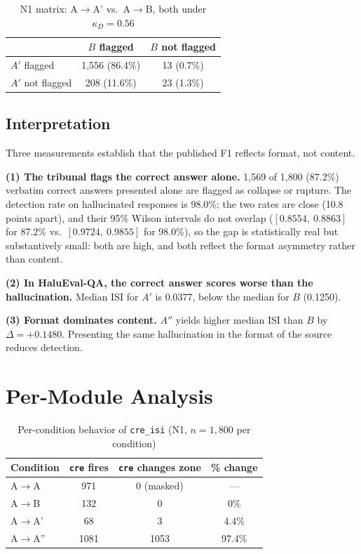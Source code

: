 \documentclass[11pt,a4paper]{article}
\begin{document}
\begin{table}[H]
\centering
\caption{N1 matrix: A$\rightarrow$A' vs.\ A$\rightarrow$B, both under $\kappa_D=0.56$}
\label{tab:n1-matrix}
\begin{tabular}{@{}lcc@{}}
\toprule
 & $B$ flagged & $B$ not flagged \\
\midrule
$A'$ flagged & 1{,}556 (86.4\%) & 13 (0.7\%) \\
$A'$ not flagged & 208 (11.6\%) & 23 (1.3\%) \\
\bottomrule
\end{tabular}
\end{table}

\subsection{Interpretation}
Three measurements establish that the published F1 reflects format, not content.

\textbf{(1) The tribunal flags the correct answer alone.} 1{,}569 of 1{,}800 (87.2\%) verbatim correct answers presented alone are flagged as collapse or rupture. The detection rate on hallucinated responses is 98.0\%; the two rates are close (10.8 points apart), and their 95\% Wilson intervals do not overlap ($[0.8554,\ 0.8863]$ for 87.2\% vs.\ $[0.9724,\ 0.9855]$ for 98.0\%), so the gap is statistically real but substantively small: both are high, and both reflect the format asymmetry rather than content.

\textbf{(2) In HaluEval-QA, the correct answer scores worse than the hallucination.} Median ISI for $A'$ is 0.0377, below the median for $B$ (0.1250).

\textbf{(3) Format dominates content.} $A''$ yields higher median ISI than $B$ by $\Delta = +0.1480$. Presenting the same hallucination in the format of the source reduces detection.

\section{Per-Module Analysis}
\label{sec:cre-contribution}

\begin{table}[H]
\centering
\caption{Per-condition behavior of \texttt{cre\_isi} (N1, $n=1{,}800$ per condition)}
\label{tab:cre-by-condition}
\begin{tabular}{@{}lccc@{}}
\toprule
Condition & \texttt{cre} fires & \texttt{cre} changes zone & \% change \\
\midrule
A$\rightarrow$A   & 971 & 0 (masked) & --- \\
A$\rightarrow$B   & 132 & 0 & 0\% \\
A$\rightarrow$A'  &  68 & 3 & 4.4\% \\
A$\rightarrow$A'' & 1081 & 1053 & 97.4\% \\
\bottomrule
\end{tabular}
\end{table}
\end{document}
